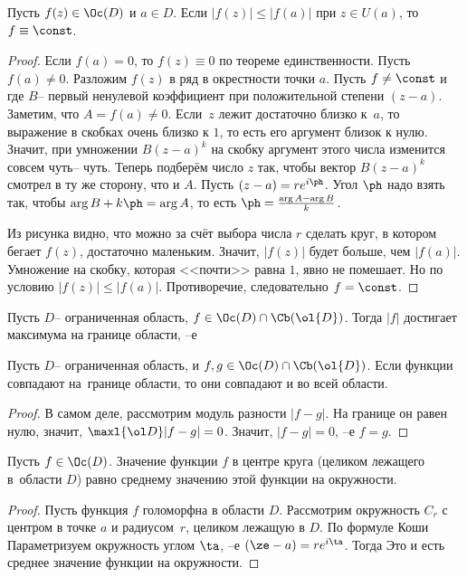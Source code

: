 \documentclass[a4paper]{article}
\begin{document}
\begin{theorem}
Пусть $f(z)\in\Oc(D)$ и $a \in D$. Если $|f(z)| \le |f(a)|$ при $z \in U(a)$, то $f \equiv \const$.
\end{theorem}
\begin{proof}
Если $f(a)=0$, то $f(z)\equiv 0$ по теореме единственности. Пусть $f(a) \neq 0$.
Разложим $f(z)$ в ряд в окрестности точки $a$. Пусть $f \neq \const$ и
где $B$-- первый ненулевой коэффициент при положительной степени $(z-a)$. Заметим, что $A = f(a) \neq 0$.
Если~$z$ лежит достаточно близко к~$a$, то выражение в скобках очень близко к $1$, то есть его аргумент близок к нулю.
Значит, при умножении $B(z-a)^k$ на скобку аргумент этого числа изменится совсем чуть-- чуть.
Теперь подберём число $z$ так, чтобы вектор $B(z-a)^k$ смотрел в ту же сторону, что и $A$.
Пусть $(z-a)=re^{i\ph}$. Угол $\ph$ надо взять так, чтобы $\arg B+k\ph=\arg A$, то есть $\ph = \frac{\arg A-\arg B}{k}$.

Из рисунка видно, что можно за счёт выбора числа $r$ сделать круг, в котором бегает $f(z)$, достаточно маленьким.
Значит, $|f(z)|$ будет больше, чем $|f(a)|$. Умножение на скобку, которая <<почти>> равна $1$, явно не помешает.
Но по условию $|f(z)| \le |f(a)|$. Противоречие, следовательно $f = \const$.
\end{proof}

\begin{imp}
Пусть $D$-- ограниченная область, $f \in \Oc(D) \cap \Cb(\ol{D})$. Тогда $|f|$ достигает максимума
на границе области, --е
\end{imp}
\begin{imp}
Пусть $D$-- ограниченная область, и $f,g \in\Oc(D) \cap \Cb(\ol{D})$. Если функции совпадают на~границе области,
то они совпадают и во всей области.
\end{imp}
\begin{proof}
В самом деле, рассмотрим модуль разности $|f - g|$. На границе он равен нулю, значит, $\maxl{\ol D} |f-g| = 0$.
Значит, $|f-g|=0$, --е $f=g$.
\end{proof}

\begin{theorem}[о среднем]
Пусть $f \in \Oc(D)$. Значение функции $f$ в центре круга (целиком лежащего в~области $D$) равно среднему значению
этой функции на окружности.
\end{theorem}
\begin{proof}
Пусть функция $f$ голоморфна в области $D$. Рассмотрим окружность $C_r$ с центром в точке $a$ и радиусом~$r$,
целиком лежащую в $D$. По формуле Коши
Параметризуем окружность углом $\ta$, --е $(\ze - a) = r e^{i\ta}$. Тогда
Это и есть среднее значение функции на окружности.
\end{proof}
\end{document}
